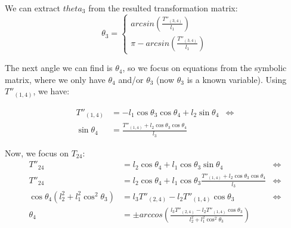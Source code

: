 We can extract $theta_3$ from the resulted transformation matrix:
\[
	\theta_3 = \left\{
	\begin{array}{l}
	arcsin\left(\frac{T''_{(3,4)}}{l_1}\right)\\
	\pi-arcsin\left(\frac{T''_{(3,4)}}{l_1}\right)
	\end{array} \right.
\]

The next angle we can find is $\theta_4$, so we focus on equations from the symbolic matrix, where we only have $\theta_4$ and/or $\theta_3$ (now $\theta_3$ is a known variable). Using $T''_{(1,4)}$, we have:

\begin{align*}
T''_{(1,4)} &= -l_1 \cos\theta_3 \cos\theta_4 + l_2 \sin\theta_4 &\Leftrightarrow\\
\sin\theta_4 &= \frac{T''_{(1,4)} + l_2\cos\theta_3\cos\theta_4}{l_3}
\end{align*}

Now, we focus on $T_{24}$:
\begin{align*}
T''_{24} &= l_2 \cos\theta_4 + l_1 \cos\theta_3 \sin\theta_4 &\Leftrightarrow\\
T''_{24} &= l_2 \cos\theta_4 + l_1 \cos\theta_3\frac{T''_{(1,4)} + l_2\cos\theta_3\cos\theta_4}{l_3} &\Leftrightarrow\\
\cos\theta_4 \left( l_2^2+l_1^2\cos^2\theta_3 \right) &= l_3 T''_{(2,4)} - l_2T''_{(1,4)}\cos\theta_3 &\Leftrightarrow\\
\theta_4 &= \pm arccos\left( \frac{l_3 T''_{(2,4)} - l_2T''_{(1,4)}\cos\theta_3}{l_2^2+l_1^2\cos^2\theta_3} \right)
\end{align*}

